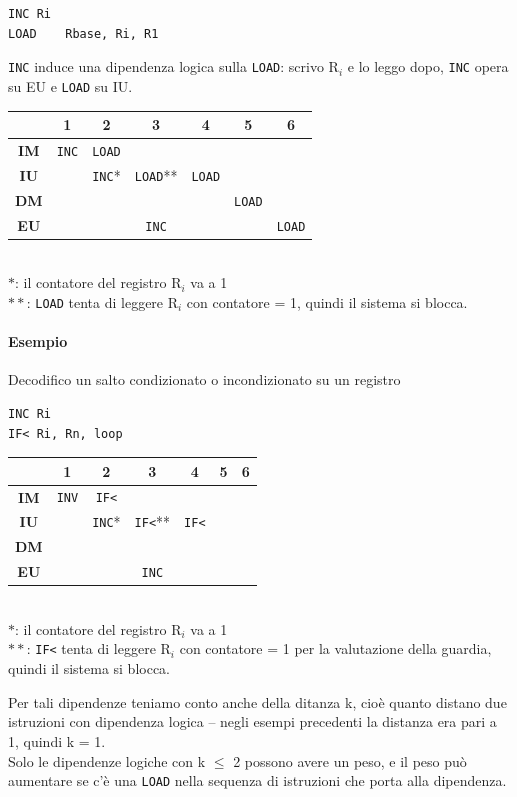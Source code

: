 \documentclass[10pt]{report}
\begin{document}
\begin{multicols}{2}
\begin{lstlisting}
INC	Ri
LOAD	Rbase, Ri, R1
\end{lstlisting}
\texttt{INC} induce una dipendenza logica sulla \texttt{LOAD}: scrivo R$_i$ e lo leggo dopo, \texttt{INC} opera su EU e \texttt{LOAD} su IU.
\columnbreak

\begin{tabular}{c|c|c|c|c|c|c|}
	 & 1 & 2 & 3 & 4 & 5 & 6 \\
	\hline
	\textbf{IM} & \texttt{INC} & \texttt{LOAD} & & & & \\
	\hline
	\textbf{IU} & & \texttt{INC}* & \texttt{LOAD}** & \texttt{LOAD} & & \\
	\hline
	\textbf{DM} & & & & & \texttt{LOAD} & \\
	\hline
	\textbf{EU} & & & \texttt{INC} & & & \texttt{LOAD} \\
	\hline
\end{tabular}\\

$*$: il contatore del registro R$_i$ va a 1\\

$**$: \texttt{LOAD} tenta di leggere R$_i$ con contatore = 1, quindi il sistema si blocca.
\end{multicols}
\paragraph{Esempio} Decodifico un salto condizionato o incondizionato su un registro

\begin{multicols}{2}
\begin{lstlisting}
INC	Ri
IF<	Ri, Rn, loop
\end{lstlisting}
\columnbreak

\begin{tabular}{c|c|c|c|c|c|c|}
	 & 1 & 2 & 3 & 4 & 5 & 6 \\
	\hline
	\textbf{IM} & \texttt{INV} & \texttt{IF<} & & & & \\
	\hline
	\textbf{IU} & & \texttt{INC}* &\texttt{IF<}** & \texttt{IF<} & & \\
	\hline
	\textbf{DM} & & & & & & \\
	\hline
	\textbf{EU} & & & \texttt{INC} & & & \\
	\hline
\end{tabular}\\

$*$: il contatore del registro R$_i$ va a 1\\

$**$: \texttt{IF<} tenta di leggere R$_i$ con contatore = 1 per la valutazione della guardia, quindi il sistema si blocca.
\end{multicols}
Per tali dipendenze teniamo conto anche della ditanza k, cioè quanto distano due istruzioni con dipendenza logica -- negli esempi precedenti la distanza era pari a 1, quindi k = 1.\\
Solo le dipendenze logiche con k $\leq$ 2 possono avere un peso, e il peso può aumentare se c'è una \texttt{LOAD} nella sequenza di istruzioni che porta alla dipendenza.
\end{document}
